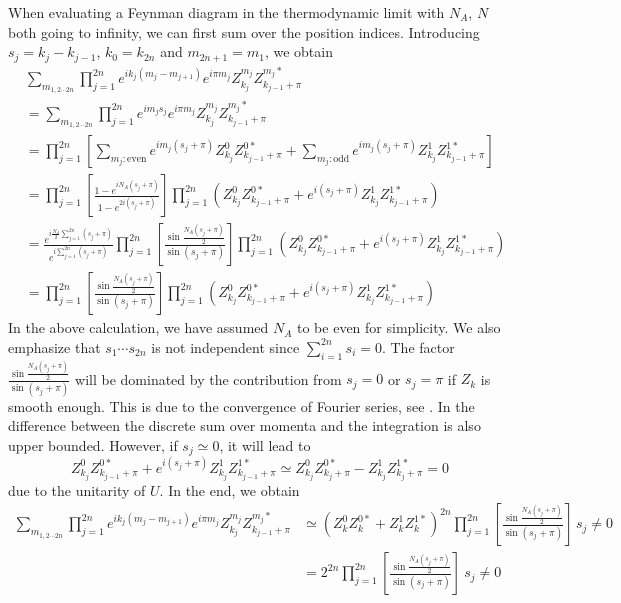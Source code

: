 \documentclass[aps,onecolumn,nofootinbib,superscriptaddress,notitlepage,longbibliography]{revtex4-1}
\begin{document}
When evaluating a Feynman diagram in the thermodynamic limit with %
$N_{A}$, $N$ both going to infinity,
we can first sum over the position indices. Introducing $s_{j}=k_{j}-k_{j-1}$, $k_{0}=k_{2n}$
and $m_{2n+1}=m_{1}$, we obtain
\begin{align*}
 & \sum_{m_{1,2\cdots2n}}\prod_{j=1}^{2n}e^{ik_{j}(m_{j}-m_{j+1})}e^{i\pi m_{j}}Z_{k_{j}}^{m_{j}}Z_{k_{j-1}+\pi}^{m_{j}*}\\
 & =\sum_{m_{1,2\cdots2n}}\prod_{j=1}^{2n}e^{im_{j}s_{j}}e^{i\pi m_{j}}Z_{k_{j}}^{m_{j}}Z_{k_{j-1}+\pi}^{m_{j}*}\\
 & =\prod_{j=1}^{2n}\left[\sum_{m_{j}:\mathrm{even}}e^{im_{j}(s_{j}+\pi)}Z_{k_{j}}^{0}Z_{k_{j-1}+\pi}^{0*}+\sum_{m_{j}:\mathrm{odd}}e^{im_{j}(s_{j}+\pi)}Z_{k_{j}}^{1}Z_{k_{j-1}+\pi}^{1*}\right]\\
 & =\prod_{j=1}^{2n}\left[\frac{1-e^{iN_{A}(s_{j}+\pi)}}{1-e^{2i(s_{j}+\pi)}}\right]\prod_{j=1}^{2n}(Z_{k_{j}}^{0}Z_{k_{j-1}+\pi}^{0*}+e^{i(s_{j}+\pi)}Z_{k_{j}}^{1}Z_{k_{j-1}+\pi}^{1*})\\
 & =\frac{e^{i\frac{N_{A}}{2}\sum_{j=1}^{2n}(s_{j}+\pi)}}{e^{i\sum_{j=1}^{2n}(s_{j}+\pi)}}\prod_{j=1}^{2n}\left[\frac{\sin\frac{N_{A}(s_{j}+\pi)}{2}}{\sin(s_{j}+\pi)}\right]\prod_{j=1}^{2n}(Z_{k_{j}}^{0}Z_{k_{j-1}+\pi}^{0*}+e^{i(s_{j}+\pi)}Z_{k_{j}}^{1}Z_{k_{j-1}+\pi}^{1*})\\
 & =\prod_{j=1}^{2n}\left[\frac{\sin\frac{N_{A}(s_{j}+\pi)}{2}}{\sin(s_{j}+\pi)}\right]\prod_{j=1}^{2n}(Z_{k_{j}}^{0}Z_{k_{j-1}+\pi}^{0*}+e^{i(s_{j}+\pi)}Z_{k_{j}}^{1}Z_{k_{j-1}+\pi}^{1*})
\end{align*}
In the above calculation, we have assumed $N_{A}$ to be even for simplicity. We also emphasize that $s_{1}\cdots s_{2n}$ is not independent since $\sum_{i=1}^{2n}s_{i}=0$.
The factor $\frac{\sin\frac{N_{A}(s_{j}+\pi)}{2}}{\sin(s_{j}+\pi)}$
will be dominated by the contribution from $s_{j}=0$ or $s_{j}=\pi$
if $Z_{k}$ is smooth enough. This is due to the convergence of Fourier
series, see \citep{stein2003fourier}. In \citep{Kress1998}
the difference between the discrete sum over momenta and the integration is also upper bounded. However, if $s_{j}\simeq%
0$, it will lead to 
\begin{equation}
Z_{k_{j}}^{0}Z_{k_{j-1}+\pi}^{0*}+e^{i(s_{j}+\pi)}Z_{k_{j}}^{1}Z_{k_{j-1}+\pi}^{1*}\simeq%
Z_{k_{j}}^{0}Z_{k_{j}+\pi}^{0*}-Z_{k_{j}}^{1}Z_{k_{j}+\pi}^{1*}=0
\end{equation}
due to the unitarity of $U$. In the end, %
we obtain 
\begin{align}
\sum_{m_{1,2\cdots2n}}\prod_{j=1}^{2n}e^{ik_{j}(m_{j}-m_{j+1})}e^{i\pi m_{j}}Z_{k_{j}}^{m_{j}}Z_{k_{j-1}+\pi}^{m_{j}*} & \simeq(Z_{k}^{0}Z_{k}^{0*}+Z_{k}^{1}Z_{k}^{1*})^{2n}\prod_{j=1}^{2n}\left[\frac{\sin\frac{N_{A}(s_{j}+\pi)}{2}}{\sin(s_{j}+\pi)}\right]\,s_{j}\neq 0\nonumber \\
 & =2^{2n}\prod_{j=1}^{2n}\left[\frac{\sin\frac{N_{A}(s_{j}+\pi)}{2}}{\sin(s_{j}+\pi)}\right]\ s_{j}\neq 0
 \label{eq:Summing_Over_position}
\end{align}
\end{document}
